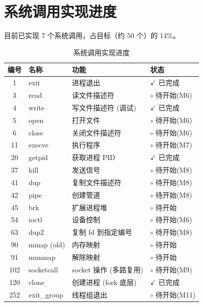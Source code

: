 \documentclass[12pt,a4paper]{article}
\newcommand{\statusdone}{\textcolor{done}{$\checkmark$ 已完成}}
\newcommand{\statuspending}{\textcolor{pending}{$\circ$ 待开始}}
\begin{document}
\section{系统调用实现进度}

目前已实现 7 个系统调用，占目标（约 50 个）的 14\%。

\begin{table}[h]
\centering
\begin{tabular}{clll}
\toprule
\textbf{编号} & \textbf{名称} & \textbf{功能} & \textbf{状态} \\
\midrule
1  & exit       & 进程退出              & \statusdone \\
3  & read       & 读文件描述符          & \statuspending (M6) \\
4  & write      & 写文件描述符 (调试)   & \statusdone \\
5  & open       & 打开文件              & \statuspending (M6) \\
6  & close      & 关闭文件描述符        & \statuspending (M6) \\
11 & execve     & 执行程序              & \statuspending (M7) \\
20 & getpid     & 获取进程 PID          & \statusdone \\
37 & kill       & 发送信号              & \statuspending (M8) \\
41 & dup        & 复制文件描述符        & \statuspending (M8) \\
42 & pipe       & 创建管道              & \statuspending (M8) \\
45 & brk        & 扩展进程堆            & \statuspending \\
54 & ioctl      & 设备控制              & \statuspending (M6) \\
63 & dup2       & 复制 fd 到指定编号    & \statuspending (M8) \\
90 & mmap (old) & 内存映射              & \statuspending \\
91 & munmap     & 解除映射              & \statuspending \\
102 & socketcall & socket 操作 (多路复用) & \statuspending (M9) \\
120 & clone      & 创建进程 (fork 底层)  & \statusdone \\
252 & exit\_group & 线程组退出            & \statuspending (M11) \\
\bottomrule
\end{tabular}
\caption{系统调用实现进度}
\end{table}
\end{document}
